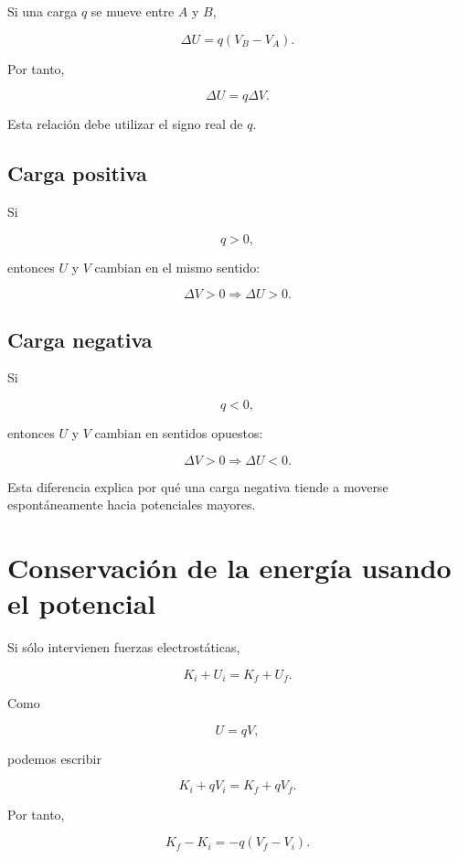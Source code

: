 Si una carga \(q\) se mueve entre \(A\) y \(B\),

\[
\Delta U=q(V_B-V_A).
\]

Por tanto,

\begin{equation}
\boxed{
\Delta U=q\Delta V
}.
\end{equation}

Esta relación debe utilizar el signo real de \(q\).


\subsection{Carga positiva}

Si

\[
q>0,
\]

entonces \(U\) y \(V\) cambian en el mismo sentido:

\[
\Delta V>0
\Longrightarrow
\Delta U>0.
\]


\subsection{Carga negativa}

Si

\[
q<0,
\]

entonces \(U\) y \(V\) cambian en sentidos opuestos:

\[
\Delta V>0
\Longrightarrow
\Delta U<0.
\]

Esta diferencia explica por qué una carga negativa tiende a moverse espontáneamente
hacia potenciales mayores.


\section{Conservación de la energía usando el potencial}

Si sólo intervienen fuerzas electrostáticas,

\[
K_i+U_i=K_f+U_f.
\]

Como

\[
U=qV,
\]

podemos escribir

\begin{equation}
\boxed{
K_i+qV_i=K_f+qV_f
}.
\end{equation}

Por tanto,

\begin{equation}
\boxed{
K_f-K_i
=
-q(V_f-V_i)
}.
\end{equation}

